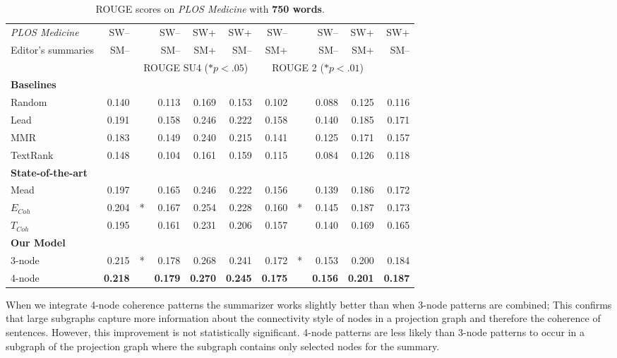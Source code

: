 \begin{table}[!ht]
	\begin{center}
		\begin{tabular}{lr@{}lrrr||r@{}lrrr}
		\hline
		\emph{PLOS Medicine}& SW--& & SW-- & SW+ & SW+& SW-- & & SW-- & SW+ & SW+ \\
		Editor's summaries  & SM-- & & SM-- &  SM+ & SM-- &  SM+  & & SM-- &  SM+  & SM-- \\\hline
		&& \multicolumn{4}{c||}{ROUGE SU4 ($\ast p<.05$)} & \multicolumn{4}{c}{ROUGE 2 ($\ast p<.01$)}\\
		\hline
		\textbf{Baselines} & & & & & & & & & &\\
		Random &  0.140& & 0.113 & 0.169  & 0.153 &  0.102 & & 0.088 & 0.125 & 0.116 \\
		Lead & 0.191 & & 0.158 & 0.246 & 0.222  & 0.158 & & 0.140 &0.185 &0.171   \\
		MMR & 0.183& & 0.149 & 0.240 & 0.215 & 0.141 & & 0.125 & 0.171 &0.157 \\
		TextRank & 0.148& & 0.104 & 0.161 & 0.159 & 0.115 & & 0.084 &0.126 & 0.118\\
		\textbf{State-of-the-art} & & & & & & & & & & \\
		Mead & 0.197 & & 0.165 & 0.246 & 0.222& 0.156 & &0.139 & 0.186 & 0.172 \\
		$E_{Coh}$ & 0.204&* & 0.167 & 0.254& 0.228 &0.160 &* & 0.145 &0.187 & 0.173\\
		$T_{Coh}$\ & 0.195 & &0.161 & 0.231 &0.206 & 0.157 &  & 0.140 &0.169 & 0.165 \\
		\textbf{Our Model} & & & & & & & & & &\\
		3-node &0.215& * &0.178& 0.268& 0.241& 0.172 & * & 0.153 & 0.200 &0.184 \\
		4-node & \textbf{0.218}& & \textbf{0.179} & \textbf{0.270} & \textbf{0.245}  & \textbf{0.175} & & \textbf{0.156} & \textbf{0.201} & \textbf{0.187} \\
		\hline
		\end{tabular}
	\end{center}
	\caption{ROUGE scores on \emph{PLOS Medicine} with \textbf{750 words}.}
	\label{tab:plos-750words}
\end{table}

When we integrate 4-node coherence patterns the summarizer works slightly better than when 3-node patterns are combined; This confirms that large subgraphs capture more information about the connectivity style of nodes in a projection graph and therefore the coherence of sentences.  
However, this improvement is not statistically significant. 
4-node patterns are less likely than 3-node patterns to occur in a subgraph of the projection graph where the subgraph contains only selected nodes for the summary. 

